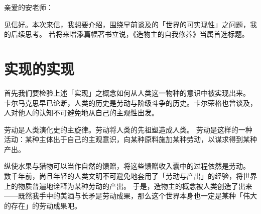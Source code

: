 

\renewcommand{\cachedcoverpagetextcolor}[0]{white}
\renewcommand{\coverbgshiftx}{0mm}














\renewcommand{\fontforsection}[0]{\normalsize\bfseries}


\noindent
亲爱的安老师：

见信好。本次来信，我想要介绍，围绕早前谈及的「世界的可实现性」之问题，我的后续思考。
若将来增添篇幅著书立说，《造物主的自我修养》当属首选标题。

\section{实现的实现}

首先我们要检验上述「实现」之概念如何从人类这一物种的意识中被实现出来。
卡尔马克思早已论断，人类的历史是劳动与阶级斗争的历史。卡尔荣格也曾谈及，人对他人的认知不可避免地从自己的主观性出发。

劳动是人类演化史的主旋律。劳动将人类的先祖塑造成人类。
劳动是这样的一种活动：某种主体出于自己的主观意识，向某种原料施加某种劳动，以谋求得到某种产出。

纵使水果与猎物可以当作自然的馈赠，将这些馈赠收入囊中的过程依然是劳动。
数千年前，尚且年轻的人类文明不可避免地套用了「劳动与产出」的经验，将世界上的物质普遍地诠释为某种劳动的产出。
于是，造物主的概念被人类创造了出来——既然我手中的美酒与长矛是劳动成果，那么这个世界本身也一定是某种「伟大的存在」的劳动成果吧。

